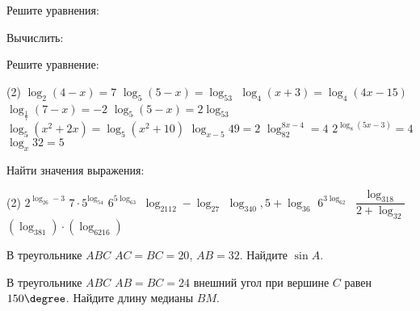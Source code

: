 \begin{class}[number=2]
	\begin{listofex}
		\item Решите уравнения:
			\begin{itasks}[2]
			\task {}
			\task {}
			\task {}
			\task {}
			\task {}
			\task {}
			\task {}
		\end{itasks}
		\item Вычислить:
		\begin{itasks}[1]
			\task {}
			\task {}
			\task {}
			\task {}
		\end{itasks}
		\item {}
		\item Решите уравнение:
		\begin{tasks}(2)
			\task \( \log_2(4-x)=7 \)
			\task \( \log_5(5-x)=\log_53 \)
			\task \( \log_4(x+3)=\log_4(4x-15) \)
			\task \( \log_{\frac{1}{7}}(7-x)=-2 \)
			\task \( \log_5(5-x)=2\log_53 \)
			\task \( \log_5(x^2+2x)=\log_5(x^2+10) \)
			\task \( \log_{x-5}49=2 \)
			\task \( \log_82^{8x-4}=4 \)
			\task \( 2^{\log_8(5x-3)}=4 \)
			\task \( \log_x32=5 \)
		\end{tasks}
	
	\end{listofex}
\end{class}

\begin{homework}[number=1]
		\begin{listofex}
			\item Найти значения выражения:
			\begin{tasks}(2)
				\task \( 2^{\log_26-3} \)
				\task \( 7\cdot5^{\log_54} \)
				\task \( 6^{5\log_63} \)
				\task \( \log_2112-\log_27 \)
				\task \( \log_340,5+\log_36 \)
				\task \( 6^{3\log_62} \)
				\task \( \dfrac{\log_318}{2+\log_32} \)
				\task \( (\log_381)\cdot(\log_6216) \)
			\end{tasks}
			\item В треугольнике \( ABC \) \( AC=BC=20 \), \( AB=32  \). Найдите  \( \sin A \).
			\item В треугольнике \( ABC \) \( AB=BC=24  \) внешний угол при вершине \( C  \) равен \( 150\degree  \). Найдите длину медианы \( BM \).
		\end{listofex}
\end{homework}

